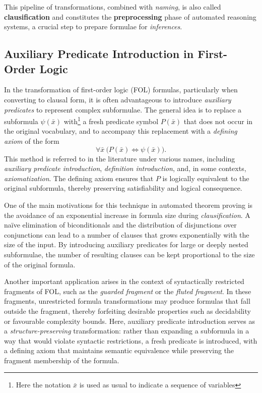 This pipeline of transformations, combined with \textit{naming}, is also called \textbf{clausification} and  constitutes the \textbf{preprocessing} phase of automated reasoning systems, a crucial step to prepare formulae for \textit{inferences}.

\subsection{Auxiliary Predicate Introduction in First-Order Logic}

In the transformation of first-order logic (FOL) formulas, particularly when converting to clausal form, it is often advantageous to introduce \emph{auxiliary predicates} to represent complex subformulae. The general idea is to replace a subformula \(\psi(\bar{x})\) with\footnote{Here the notation \(\bar{x}\) is used as usual to indicate a sequence of variables} a fresh predicate symbol \(P(\bar{x})\) that does not occur in the original vocabulary, and to accompany this replacement with a \emph{defining axiom} of the form
\[
\forall \bar{x}\ \big(P(\bar{x}) \iff \psi(\bar{x})\big).
\]
This method is referred to in the literature under various names, including \emph{auxiliary predicate introduction}, \emph{definition introduction}, and, in some contexts, \emph{axiomatization}. The defining axiom ensures that \(P\) is logically equivalent to the original subformula, thereby preserving satisfiability and logical consequence.

One of the main motivations for this technique in automated theorem proving is the avoidance of an exponential increase in formula size during \emph{clausification}.
A naïve elimination of biconditionals and the distribution of disjunctions over conjunctions can lead to a number of clauses that grows exponentially with the size of the input.
By introducing auxiliary predicates for large or deeply nested subformulae, the number of resulting clauses can be kept proportional to the size of the original formula.

Another important application arises in the context of syntactically restricted fragments of FOL, such as the \emph{guarded fragment} or the \emph{fluted fragment}.
In these fragments, unrestricted formula transformations may produce formulas that fall outside the fragment, thereby forfeiting desirable properties such as decidability or favourable complexity bounds.
Here, auxiliary predicate introduction serves as a \emph{structure-preserving} transformation: rather than expanding a subformula in a way that would violate syntactic restrictions, a fresh predicate is introduced, with a defining axiom that maintains semantic equivalence while preserving the fragment membership of the formula.

